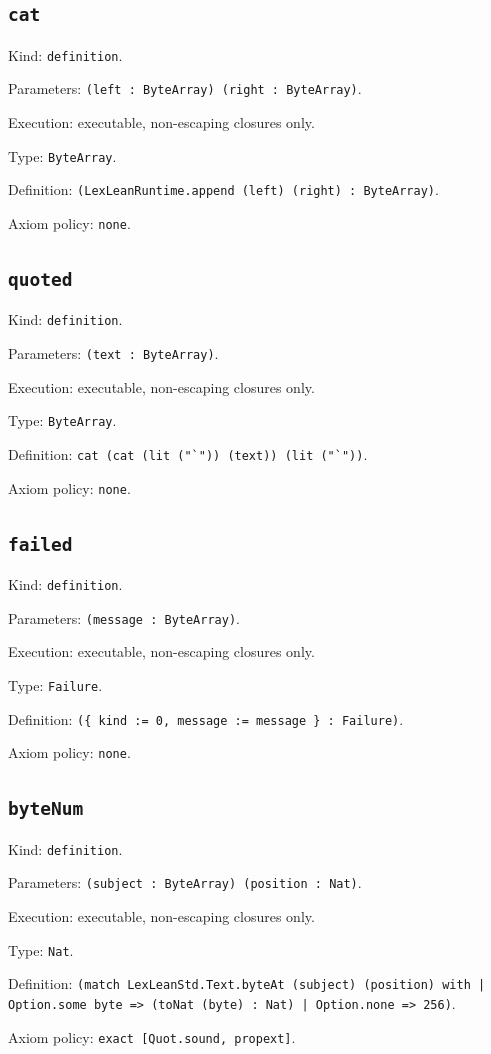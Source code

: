 \documentclass[11pt]{article}
\begin{document}
\subsection*{\texttt{cat}}
\noindent Kind: \texttt{definition}.\par
\noindent Parameters: \texttt{(left : ByteArray) (right : ByteArray)}.\par
\noindent Execution: executable, non-escaping closures only.\par
\noindent Type: \texttt{ByteArray}.\par
\noindent Definition: \texttt{(LexLeanRuntime.append (left) (right) : ByteArray)}.\par
\noindent Axiom policy: \texttt{none}.\par
\subsection*{\texttt{quoted}}
\noindent Kind: \texttt{definition}.\par
\noindent Parameters: \texttt{(text : ByteArray)}.\par
\noindent Execution: executable, non-escaping closures only.\par
\noindent Type: \texttt{ByteArray}.\par
\noindent Definition: \texttt{cat (cat (lit ("`")) (text)) (lit ("`"))}.\par
\noindent Axiom policy: \texttt{none}.\par
\subsection*{\texttt{failed}}
\noindent Kind: \texttt{definition}.\par
\noindent Parameters: \texttt{(message : ByteArray)}.\par
\noindent Execution: executable, non-escaping closures only.\par
\noindent Type: \texttt{Failure}.\par
\noindent Definition: \texttt{(\{ kind := 0, message := message \} : Failure)}.\par
\noindent Axiom policy: \texttt{none}.\par
\subsection*{\texttt{byteNum}}
\noindent Kind: \texttt{definition}.\par
\noindent Parameters: \texttt{(subject : ByteArray) (position : Nat)}.\par
\noindent Execution: executable, non-escaping closures only.\par
\noindent Type: \texttt{Nat}.\par
\noindent Definition: \texttt{(match LexLeanStd.Text.byteAt (subject) (position) with | Option.some byte => (toNat (byte) : Nat) | Option.none => 256)}.\par
\noindent Axiom policy: \texttt{exact [Quot.sound, propext]}.\par
\end{document}
